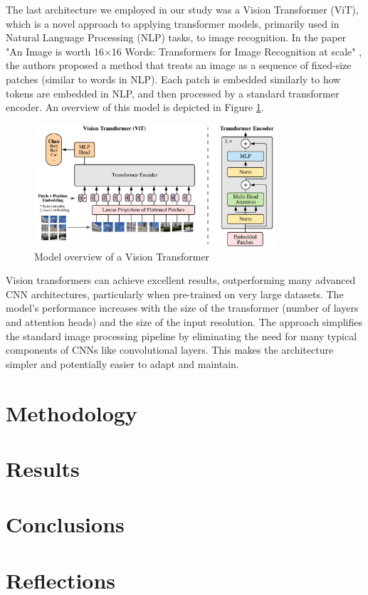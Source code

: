 \documentclass[a4paper,11pt]{article}
\begin{document}
The last architecture we employed in our study was a Vision Transformer (ViT), which is a novel approach to applying transformer models, primarily used in Natural Language Processing (NLP) tasks, to image recognition. In the paper "An Image is worth 16$\times$16 Words: Transformers for Image Recognition at scale" \cite{DBLP:journals/corr/abs-2010-11929}, the authors proposed a method that treats an image as a sequence of fixed-size patches (similar to words in NLP). Each patch is embedded similarly to how tokens are embedded in NLP, and then processed by a standard transformer encoder. An overview of this model is depicted in Figure \ref{fig:vit-arch}.

\begin{figure}[H]
    \centering 
    \includegraphics[width=0.8\textwidth]{model_scheme.pdf}
    \caption{Model overview of a Vision Transformer \cite{DBLP:journals/corr/RonnebergerFB15}}
    \label{fig:vit-arch}
\end{figure}

Vision transformers can achieve excellent results, outperforming many advanced CNN architectures, particularly when pre-trained on very large datasets. The model's performance increases with the size of the transformer (number of layers and attention heads) and the size of the input resolution. The approach simplifies the standard image processing pipeline by eliminating the need for many typical components of CNNs like convolutional layers. This makes the architecture simpler and potentially easier to adapt and maintain. 

\section{Methodology}

\section{Results}

\section{Conclusions}

\section{Reflections}



\end{document}
